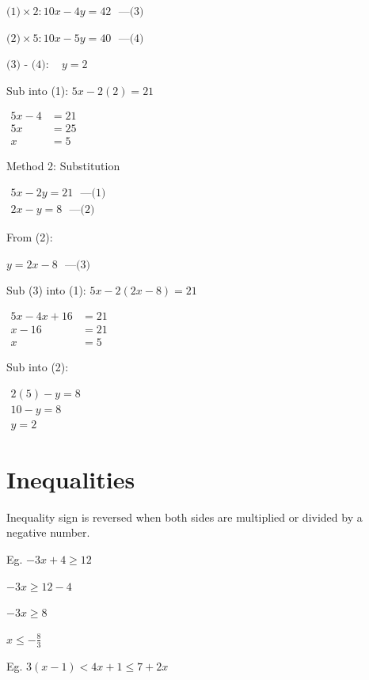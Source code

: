 \documentclass[twocolumn]{article}
\begin{document}
$\text{(1)} \times 2: 10 x-4 y=42  \ \ \ \text{---(3)}$

$\text{(2)}\times 5: 10 x-5 y=40  \ \ \ \text{---(4)}$

$\text{(3) - (4)}: \quad y=2$

Sub into (1): $5 x-2(2)=21$

$
\begin{aligned}
	5 x-4 & =21 \\
	5 x & =25 \\
	x & =5
\end{aligned}
$

\bigskip 

\noindent 
Method 2: Substitution

$
\begin{gathered}
	5 x-2 y=21 \ \ \ \text{---(1)} \\
	2 x-y=8 \ \ \ \text{---(2)}
\end{gathered}
$

From (2):

$
y=2 x-8  \ \ \ \text{---(3)}
$

Sub (3) into (1): $5 x-2(2 x-8)=21$

$
\begin{aligned}
	5 x-4 x+16 & =21 \\
	x-16 & =21 \\
	x & =5
\end{aligned}
$

Sub into (2):

$
\begin{array}{r}
	2(5)-y=8 \\
	10-y=8 \\
	y=2
\end{array}
$

\section*{Inequalities}

\noindent 
Inequality sign is reversed when both sides are multiplied or divided by a negative number.

\bigskip 

\noindent 
Eg. $-3x + 4  \geq 12$

$-3x \geq 12-4$

$-3x \geq 8$

$x \leq - \frac{8}{3}$

\bigskip 

\noindent 
Eg. $3(x-1)<4 x+1 \leq 7+2 x$
\end{document}
